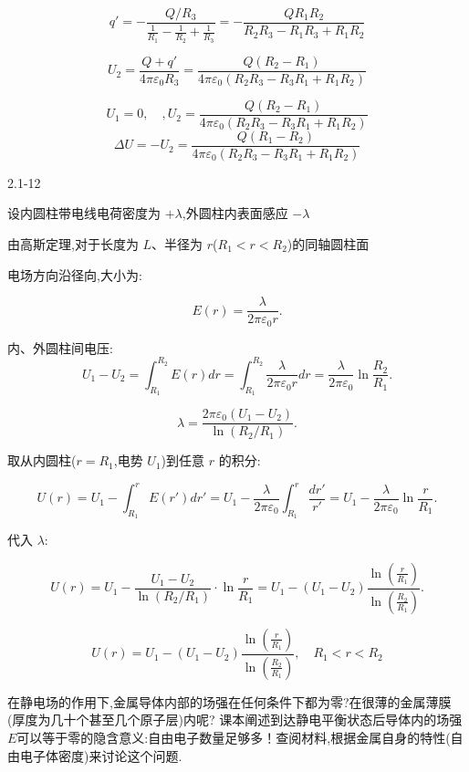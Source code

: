 \documentclass{article}
\begin{document}
$$q' = -\frac{Q/R_3}{\frac{1}{R_1} - \frac{1}{R_2} + \frac{1}{R_3}}=-\frac{QR_1R_2}{R_2R_3-R_1R_3+R_1R_2}$$

$$U_2 = \frac{Q + q'}{4\pi\varepsilon_0 R_3}=\frac{Q(R_2-R_1)}{4\pi\varepsilon_0(R_2R_3-R_3R_1+R_1R_2)}$$


$$\boxed{ U_1 = 0, \quad , U_{2}=\frac{Q(R_{2}-R_{1})}{4\pi\varepsilon_{0}(R_{2}R_{3}-R_{3}R_{1}+R_{1}R_{2})}}$$
$$\boxed{\Delta U=-U_{2}=\frac{Q(R_{1}-R_{2})}{4\pi\varepsilon_{0}(R_{2}R_{3}-R_{3}R_{1}+R_{1}R_{2})}}$$








\newpage

2.1-12 %

设内圆柱带电线电荷密度为 $ +\lambda $,外圆柱内表面感应 $ -\lambda $

由高斯定理,对于长度为 $ L $、半径为 $ r $($ R_1 < r < R_2 $)的同轴圆柱面

电场方向沿径向,大小为:

$$E(r) = \frac{\lambda}{2\pi\varepsilon_0 r}.$$


内、外圆柱间电压:
$$U_1 - U_2 = \int_{R_1}^{R_2} E(r)  dr= \int_{R_1}^{R_2} \frac{\lambda}{2\pi\varepsilon_0 r}  dr= \frac{\lambda}{2\pi\varepsilon_0} \ln\frac{R_2}{R_1}.$$

$$\lambda = \frac{2\pi\varepsilon_0 (U_1 - U_2)}{\ln(R_2/R_1)}.$$



取从内圆柱($ r = R_1 $,电势 $ U_1 $)到任意 $ r $ 的积分:

$$U(r) = U_1 - \int_{R_1}^{r} E(r')  dr'= U_1 - \frac{\lambda}{2\pi\varepsilon_0} \int_{R_1}^{r} \frac{dr'}{r'}= U_1 - \frac{\lambda}{2\pi\varepsilon_0} \ln\frac{r}{R_1}.$$

代入 $\lambda$:

$$U(r) = U_1 - \frac{U_1 - U_2}{\ln(R_2/R_1)} \cdot \ln\frac{r}{R_1}= U_1-(U_1-U_2)\frac{\ln(\frac{r}{R_1})}{\ln(\frac{R_2}{R_1})}.$$

$$
\boxed{U(r) =U_1-(U_1-U_2)\frac{\ln(\frac{r}{R_1})}{\ln(\frac{R_2}{R_1})}, \quad R_1 < r < R_2}
$$













\newpage

在静电场的作用下,金属导体内部的场强在任何条件下都为零?在很薄的金属薄膜(厚度为几十个甚至几个原子层)内呢?
课本阐述到达静电平衡状态后导体内的场强$E$可以等于零的隐含意义:自由电子数量足够多！查阅材料,根据金属自身的特性(自由电子体密度)来讨论这个问题.
\end{document}
